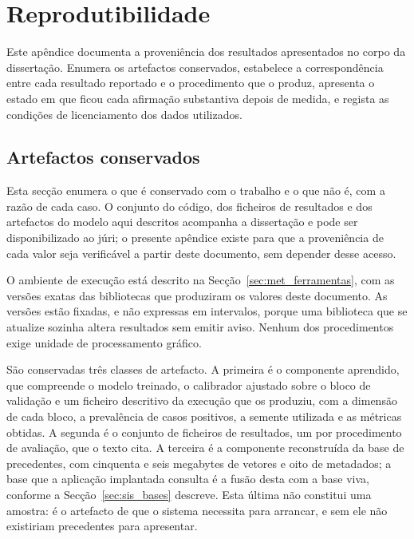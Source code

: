\chapter{Reprodutibilidade}
\label{ap:reprodutibilidade}

Este apêndice documenta a proveniência dos resultados apresentados no corpo da dissertação. Enumera
os artefactos conservados, estabelece a correspondência entre cada resultado reportado e o
procedimento que o produz, apresenta o estado em que ficou cada afirmação substantiva depois de
medida, e regista as condições de licenciamento dos dados utilizados.

\section{Artefactos conservados}
\label{sec:ap_artefactos}

Esta secção enumera o que é conservado com o trabalho e o que não é, com a razão de cada caso.
O conjunto do código, dos ficheiros de resultados e dos artefactos do modelo aqui descritos
acompanha a dissertação e pode ser disponibilizado ao júri; o presente apêndice existe para que a
proveniência de cada valor seja verificável a partir deste documento, sem depender desse acesso.

O ambiente de execução está descrito na Secção~\ref{sec:met_ferramentas}, com as versões exatas das
bibliotecas que produziram os valores deste documento. As versões estão fixadas, e não expressas em
intervalos, porque uma biblioteca que se atualize sozinha altera resultados sem emitir aviso.
Nenhum dos procedimentos exige unidade de processamento gráfico.

São conservadas três classes de artefacto. A primeira é o componente aprendido, que compreende o
modelo treinado, o calibrador ajustado sobre o bloco de validação e um ficheiro descritivo da
execução que os produziu, com a dimensão de cada bloco, a prevalência de casos positivos, a semente
utilizada e as métricas obtidas. A segunda é o conjunto de ficheiros de resultados, um por
procedimento de avaliação, que o texto cita. A terceira é a componente reconstruída da base de
precedentes, com cinquenta e seis megabytes de vetores e oito de metadados; a base que a aplicação
implantada consulta é a fusão desta com a base viva, conforme a
Secção~\ref{sec:sis_bases} descreve. Esta última não
constitui uma amostra: é o artefacto de que o sistema necessita para arrancar, e sem ele não
existiriam precedentes para apresentar.

